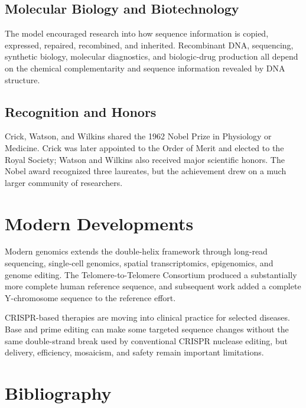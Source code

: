 \subsection{Molecular Biology and Biotechnology}

The model encouraged research into how sequence information is copied, expressed, repaired, recombined, and inherited. Recombinant DNA, sequencing, synthetic biology, molecular diagnostics, and biologic-drug production all depend on the chemical complementarity and sequence information revealed by DNA structure.

\subsection{Recognition and Honors}

Crick, Watson, and Wilkins shared the 1962 Nobel Prize in Physiology or Medicine. Crick was later appointed to the Order of Merit and elected to the Royal Society; Watson and Wilkins also received major scientific honors. The Nobel award recognized three laureates, but the achievement drew on a much larger community of researchers.

\section{Modern Developments}

Modern genomics extends the double-helix framework through long-read sequencing, single-cell genomics, spatial transcriptomics, epigenomics, and genome editing. The Telomere-to-Telomere Consortium produced a substantially more complete human reference sequence, and subsequent work added a complete Y-chromosome sequence to the reference effort.\cite{t2t-genome,t2t-y}

CRISPR-based therapies are moving into clinical practice for selected diseases. Base and prime editing can make some targeted sequence changes without the same double-strand break used by conventional CRISPR nuclease editing, but delivery, efficiency, mosaicism, and safety remain important limitations.

\section{Bibliography}

